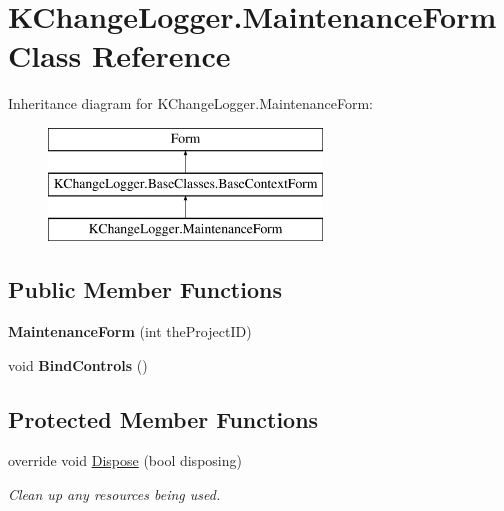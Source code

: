 \hypertarget{class_k_change_logger_1_1_maintenance_form}{\section{K\-Change\-Logger.\-Maintenance\-Form Class Reference}
\label{class_k_change_logger_1_1_maintenance_form}
}
Inheritance diagram for K\-Change\-Logger.\-Maintenance\-Form\-:\begin{figure}[H]
\begin{center}
\leavevmode
\includegraphics[height=3.000000cm]{class_k_change_logger_1_1_maintenance_form}
\end{center}
\end{figure}
\subsection*{Public Member Functions}
\begin{DoxyCompactItemize}
\item 
\hypertarget{class_k_change_logger_1_1_maintenance_form_ad80b31312ae708b37004cf51d0a13832}{{\bfseries Maintenance\-Form} (int the\-Project\-I\-D)}\label{class_k_change_logger_1_1_maintenance_form_ad80b31312ae708b37004cf51d0a13832}

\item 
\hypertarget{class_k_change_logger_1_1_maintenance_form_a7630ac0f0194b76f73a243cd27210395}{void {\bfseries Bind\-Controls} ()}\label{class_k_change_logger_1_1_maintenance_form_a7630ac0f0194b76f73a243cd27210395}

\end{DoxyCompactItemize}
\subsection*{Protected Member Functions}
\begin{DoxyCompactItemize}
\item 
override void \hyperlink{class_k_change_logger_1_1_maintenance_form_a75510e628677b80900f86ed1976da28a}{Dispose} (bool disposing)
\begin{DoxyCompactList}\small\item\em Clean up any resources being used. \end{DoxyCompactList}\end{DoxyCompactItemize}
